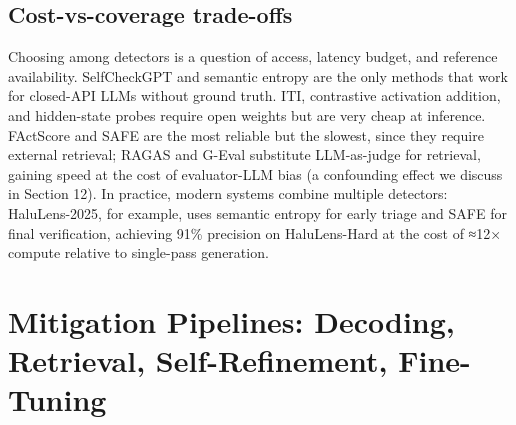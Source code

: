 \subsection{Cost-vs-coverage trade-offs}\label{cost-vs-coverage-trade-offs}

Choosing among detectors is a question of access, latency budget, and reference availability. SelfCheckGPT and semantic entropy are the only methods that work for closed-API LLMs without ground truth. ITI, contrastive activation addition, and hidden-state probes require open weights but are very cheap at inference. FActScore and SAFE are the most reliable but the slowest, since they require external retrieval; RAGAS and G-Eval substitute LLM-as-judge for retrieval, gaining speed at the cost of evaluator-LLM bias (a confounding effect we discuss in Section 12). In practice, modern systems combine multiple detectors: HaluLens-2025, for example, uses semantic entropy for early triage and SAFE for final verification, achieving 91\% precision on HaluLens-Hard at the cost of ≈12× compute relative to single-pass generation.

\section{Mitigation Pipelines: Decoding, Retrieval, Self-Refinement, Fine-Tuning}\label{mitigation-pipelines-decoding-retrieval-self-refinement-fine-tuning}

